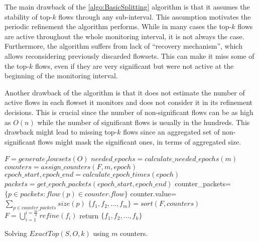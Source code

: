The main drawback of the \ref{algo:BasicSplitting} algorithm is that it assumes the stability of top-$k$ flows through any sub-interval. This assumption motivates the periodic refinement the algorithm performs.
While in many cases the top-$k$ flows are active throughout the whole monitoring interval, it is not always the case. Furthermore, the algorithm suffers from lack of ``recovery mechanism'', which allows reconsidering previously discarded flowsets. This can make it miss some of the top-$k$ flows, even if they are very significant but were not active at the beginning of the monitoring interval.

Another drawback of the algorithm is that it does not estimate the number of active flows in each flowset it monitors and does not consider it in its refinement decisions. This is crucial since the number of non-significant flows can be as high as $O(n)$ while the number of significant flows is usually in the hundreds. This drawback might lead to missing top-$k$ flows since an aggregated set of non-significant flows might mask the significant ones, in terms of aggregated size.
\usepackage{algorithmic}
\begin{algorithm}
    $F = generate_flowsets(O)$\;
    $needed\_epochs=calculate\_needed\_epochs(m)$\;
    {
        $counters=assign\_counters(F, m, epoch)$\;
        $epoch\_start, epoch\_end=calculate\_epoch\_times(epoch)$\;
        $packets=get\_epoch\_packets(epoch\_start, epoch\_end)$\;
         {
            counter\_packets=$\{p\in packets : flow(p)\in counter.flow\}$\;
            counter.value=$\sum_{p\in counter\_packets}size(p)$\;
        }
        $\{f_1,f_2,\dots,f_m\}=sort(F, counters)$\;
        $F=\bigcup_{i=1}^{i=\frac{m}{2}}refine(f_i)$\;
    }
    return $\{f_1,f_2,\dots,f_k\}$
    \caption{Solving $ExactTop(S,O,k)$ using $m$ counters.}
    \label{algo:BasicSplitting}
\end{algorithm}
